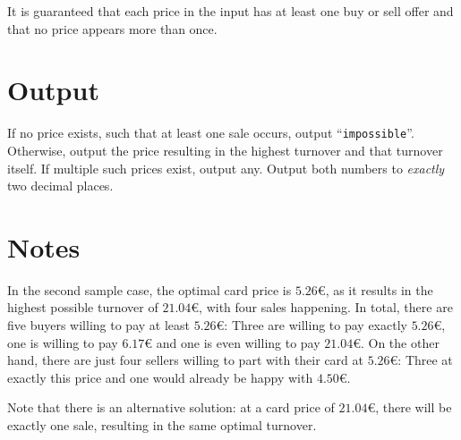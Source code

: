 It is guaranteed that each price in the input has at least one buy or sell offer and that no price appears more than once.

\section*{Output}
If no price exists, such that at least one sale occurs, output ``\texttt{impossible}''. Otherwise, output the price resulting in the highest
turnover and that turnover itself. If multiple such prices exist, output any. Output both numbers to \textit{exactly} two decimal places.

\section*{Notes}
In the second sample case, the optimal card price is $5.26$€, as it results in the highest possible turnover of $21.04$€, with four sales happening. In total,
there are five buyers willing to pay at least $5.26$€: Three are willing to pay exactly $5.26$€, one is willing to pay $6.17$€ and one is even
willing to pay $21.04$€. On the other hand, there are just four sellers willing to part with their card at $5.26$€: Three at exactly
this price and one would already be happy with $4.50$€.

Note that there is an alternative solution: at a card price of $21.04$€, there will be exactly one sale, resulting in the same optimal turnover. 

